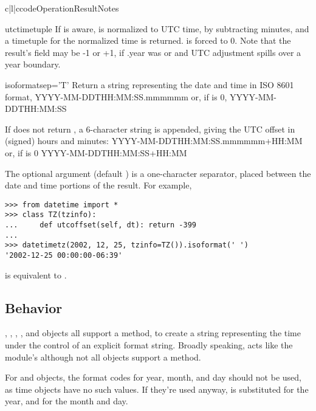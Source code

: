 \begin{tableiii}{c|l|c}{code}{Operation}{Result}{Notes}
\begin{methoddesc}{utctimetuple}{}
    If  is aware,  is normalized to UTC time, by subtracting
     minutes, and a timetuple for the
    normalized time is returned.   is forced to 0.
    Note that the result's  field may be
    -1 or +1, if .year was
     or  and UTC adjustment spills over a
    year boundary.
\end{methoddesc}

\begin{methoddesc}{isoformat}{sep='T'}
    Return a string representing the date and time in ISO 8601 format,
        YYYY-MM-DDTHH:MM:SS.mmmmmm
    or, if  is 0,
        YYYY-MM-DDTHH:MM:SS

    If  does not return , a 6-character
    string is appended, giving the UTC offset in (signed) hours and
    minutes:
        YYYY-MM-DDTHH:MM:SS.mmmmmm+HH:MM
    or, if  is 0
        YYYY-MM-DDTHH:MM:SS+HH:MM

    The optional argument  (default ) is a
    one-character separator, placed between the date and time portions
    of the result.  For example,

\begin{verbatim}
>>> from datetime import *
>>> class TZ(tzinfo):
...     def utcoffset(self, dt): return -399
...
>>> datetimetz(2002, 12, 25, tzinfo=TZ()).isoformat(' ')
'2002-12-25 00:00:00-06:39'
\end{verbatim}
\end{methoddesc}

 is equivalent to .


\subsection{ Behavior}

, , , ,
and  objects all support a 
method, to create a string representing the time under the control of
an explicit format string.  Broadly speaking,
acts like the  module's
although not all objects support a  method.

For  and  objects, the format codes for
year, month, and day should not be used, as time objects have no such
values.  If they're used anyway,  is substituted for the
year, and  for the month and day.


\end{tableiii}
